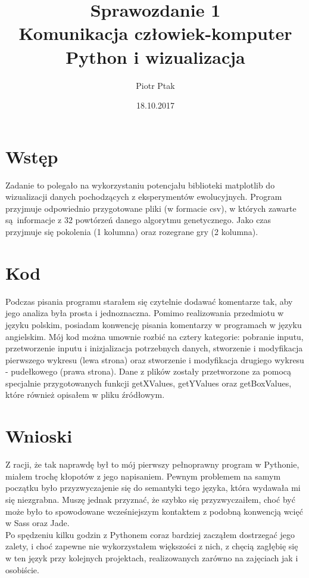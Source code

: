 \documentclass[12pt]{article}
\author{Piotr Ptak}
\date{18.10.2017}
\begin{document}
\title{Sprawozdanie 1\\Komunikacja człowiek-komputer\\Python i wizualizacja}
\maketitle


\section{Wstęp}
Zadanie to polegało na wykorzystaniu potencjału biblioteki matplotlib do wizualizacji danych pochodzących z eksperymentów ewolucyjnych. Program przyjmuje odpowiednio przygotowane pliki (w formacie csv), w których zawarte są informacje z 32 powtórzeń danego algorytmu genetycznego. Jako czas przyjmuje się pokolenia (1 kolumna) oraz rozegrane gry (2 kolumna).

\section{Kod}
Podczas pisania programu starałem się czytelnie dodawać komentarze tak, aby jego analiza była prosta i jednoznaczna. Pomimo realizowania przedmiotu w języku polskim, posiadam konwencję pisania komentarzy w programach w języku angielskim.  Mój kod można umownie rozbić na cztery kategorie: pobranie inputu, przetworzenie inputu i inizjalizacja potrzebnych danych, stworzenie i modyfikacja pierwszego wykresu (lewa strona) oraz stworzenie i modyfikacja drugiego wykresu - pudełkowego (prawa strona). Dane z plików zostały przetworzone za pomocą specjalnie przygotowanych funkcji getXValues, getYValues oraz getBoxValues, które również opisałem w pliku źródłowym.

\section{Wnioski}
Z racji, że tak naprawdę był to mój pierwszy pełnoprawny program w Pythonie, miałem trochę kłopotów z jego napisaniem. Pewnym problemem na samym początku było przyzwyczajenie się do semantyki tego języka, która wydawała mi się niezgrabna. Muszę jednak przyznać, że szybko się przyzwyczaiłem, choć być może było to spowodowane wcześniejszym kontaktem z podobną konwencją wcięć w Sass oraz Jade.\\Po spędzeniu kilku godzin z Pythonem coraz bardziej zacząłem dostrzegać jego zalety, i choć zapewne nie wykorzystałem większości z nich, z chęcią zagłębię się w ten język przy kolejnych projektach, realizowanych zarówno na zajęciach jak i osobiście.
\end{document}
